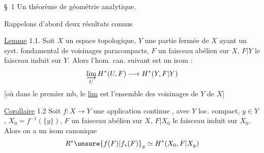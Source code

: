 \S\ 1 Un théorème de géométrie analytique.

Rappelons d'abord deux résultats connus

\uline{Lemme} 1.1. Soit $X$ un espace topologique, $Y$ une partie fermée de $X$ ayant un syst. fondamental de voisinages paracompacts, $F$ un faisceau abélien sur $X$, $F|Y$ le faisceau induit sur $Y$. Alors l'hom. can.  suivant est un isom :
\[
\varinjlim_U H^*(U,F)\longrightarrow H^*(Y,F|Y)
\]
[où dans le premier mb, le \uline{lim} est  l'ensemble des voisinages de $Y$ de $X$]

\uline{Corollaire} 1.2 Soit $f:X\longrightarrow Y$ une application continue , avec $Y$ loc. compact,  $y\in Y$, $X_0=f^{-1}(\{y\})$, $F$ un faisceau abélien sur $X$, $F|X_0$ le faisceau induit sur $X_0$. Alors on a un isom canonique
\[
R^*\unsure{f(F)|f_*(F)}_y\simeq H^*(X_0,F|X_y)
\]
